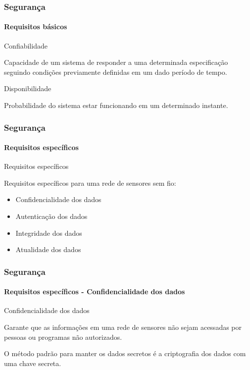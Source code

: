 \documentclass[notes]{beamer}
\begin{document}
\begin{frame}
\label{slide_69}
\frametitle{Segurança}
\framesubtitle{Requisitos básicos}

\begin{block}{Confiabilidade}

Capacidade de um sistema de responder a uma determinada especificação seguindo condições previamente definidas em um dado período de tempo.

\end{block} \pause

\begin{block}{Disponibilidade}

Probabilidade do sistema estar funcionando em um determinado instante.

\end{block}

\end{frame}

\begin{frame}
\label{slide_70}
\frametitle{Segurança}
\framesubtitle{Requisitos específicos}

\begin{block}{Requisitos específicos}

Requisitos específicos para uma rede de sensores sem fio: \pause

\begin{itemize}

\item Confidencialidade dos dados \pause
\item Autenticação dos dados \pause
\item Integridade dos dados \pause
\item Atualidade dos dados

\end{itemize}

\end{block} 

\end{frame}

\begin{frame}
\label{slide_71}
\frametitle{Segurança}
\framesubtitle{Requisitos específicos - Confidencialidade dos dados}

\begin{block}{Confidencialidade dos dados}

Garante que as informações em uma rede de sensores não sejam acessadas por pessoas ou programas não autorizados. 
\end{block} \pause

\begin{block}

O método padrão para manter os dados secretos é a criptografia dos dados com uma chave secreta.

\end{block} 

\end{frame}
\end{document}
